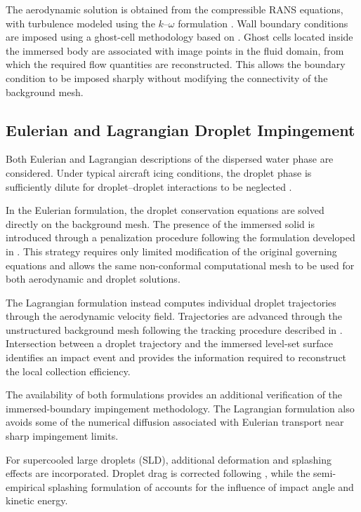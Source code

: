 \documentclass[letterpaper,times]{sae}
\begin{document}
The aerodynamic solution is obtained from the compressible RANS equations,
with turbulence modeled using the $k$--$\omega$ formulation
\cite{kOmegaMenter}. Wall boundary conditions are imposed using a ghost-cell
methodology based on \cite{CONSTANT2021110240}. Ghost cells located inside
the immersed body are associated with image points in the fluid domain, from
which the required flow quantities are reconstructed. This allows the
boundary condition to be imposed sharply without modifying the connectivity
of the background mesh.



\subsection{Eulerian and Lagrangian Droplet Impingement}

Both Eulerian and Lagrangian descriptions of the dispersed water phase are
considered. Under typical aircraft icing conditions, the droplet phase is
sufficiently dilute for droplet--droplet interactions to be neglected
\cite{guardoneReview}.

In the Eulerian formulation, the droplet conservation equations are solved
directly on the background mesh. The presence of the immersed solid is
introduced through a penalization procedure following the formulation
developed in \cite{lavoieDroplets}. This strategy requires only limited
modification of the original governing equations and allows the same
non-conformal computational mesh to be used for both aerodynamic and droplet
solutions.

The Lagrangian formulation instead computes individual droplet trajectories
through the aerodynamic velocity field. Trajectories are advanced through
the unstructured background mesh following the tracking procedure described
in \cite{rendall2014finite}. Intersection between a droplet trajectory and
the immersed level-set surface identifies an impact event and provides the
information required to reconstruct the local collection efficiency.

The availability of both formulations provides an additional verification
of the immersed-boundary impingement methodology. The Lagrangian formulation
also avoids some of the numerical diffusion associated with Eulerian
transport near sharp impingement limits.

For supercooled large droplets (SLD), additional deformation and splashing
effects are incorporated. Droplet drag is corrected following
\cite{clift2005bubbles}, while the semi-empirical splashing formulation of
\cite{wright2004semi} accounts for the influence of impact angle and kinetic
energy.
\end{document}
